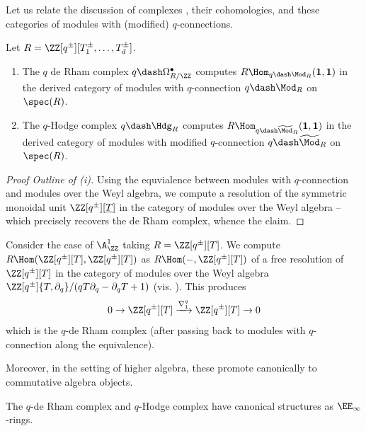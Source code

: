 Let us relate the discussion of complexes , their cohomologies, and these categories of modules with (modified) $q$-connections. 
\begin{proposition}\label{prop: algebra structures on RHom unit Ad and Gm}
    Let $R=\ZZ[q^{\pm}][T_{1}^{\pm},\dots,T_{d}^{\pm}]$.
    \begin{enumerate}[label=(\roman*)]
        \item The $q$ de Rham complex $q\dash\Omega^{\bullet}_{R/\ZZ}$ computes $R\Hom_{q\dash\Mod_{R}}(\mathbf{1},\mathbf{1})$ in the derived category of modules with $q$-connection $q\dash\Mod_{R}$ on $\spec(R)$.
        \item The $q$-Hodge complex $q\dash\Hdg_{R}$ computes $R\Hom_{q\dash\widetilde{\Mod}_{R}}(\mathbf{1},\mathbf{1})$ in the derived category of modules with modified $q$-connection $q\dash\widetilde{\Mod}_{R}$ on $\spec(R)$.
    \end{enumerate}
\end{proposition}
\begin{proof}[Proof Outline of (i)]
    Using the equvialence between modules with $q$-connection and modules over the Weyl algebra, we compute a resolution of the symmetric monoidal unit $\ZZ[q^{\pm}][\underline{T}]$ in the category of modules over the Weyl algebra -- which precisely recovers the de Rham complex, whence the claim. 
\end{proof}
\begin{example}
    Consider the case of $\A^{1}_{\ZZ}$ taking $R=\ZZ[q^{\pm}][T]$. We compute $R\Hom(\ZZ[q^{\pm}][T],\ZZ[q^{\pm}][T])$ as $R\Hom(-,\ZZ[q^{\pm}][T])$ of a free resolution of $\ZZ[q^{\pm}][T]$ in the category of modules over the Weyl algebra $\ZZ[q^{\pm}]\{T,\partial_{q}\}/(qT\partial_{q}-\partial_{q}T+1)$ (vis. ). This produces 
    $$0\to\ZZ[q^{\pm}][T]\xrightarrow{\nabla_{1}^{q}}\ZZ[q^{\pm}][T]\to0$$
    which is the $q$-de Rham complex (after passing back to modules with $q$-connection along the equivalence). 
\end{example}
Moreover, in the setting of higher algebra, these promote canonically to commutative algebra objects. 
\begin{corollary}
    The $q$-de Rham complex and $q$-Hodge complex have canonical structures as $\EE_{\infty}$-rings. 
\end{corollary}